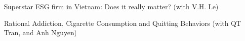 \documentclass[10.5pt]{article}
\begin{document}
\begin{enumerate}[label={[\arabic*]}]

\item Superstar ESG firm in Vietnam: Does it really matter? (with V.H. Le)



\item Rational Addiction, Cigarette Consumption and Quitting Behaviors (with QT Tran, and Anh Nguyen)

\end{enumerate}
\end{document}
